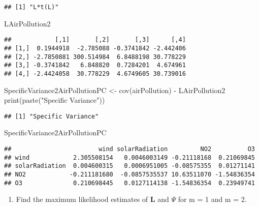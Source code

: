 \documentclass[
]{article}
\newenvironment{Shaded}{\begin{snugshade}}{\end{snugshade}}
\newcommand{\FunctionTok}[1]{\textcolor[rgb]{0.00,0.00,0.00}{#1}}
\newcommand{\NormalTok}[1]{#1}
\newcommand{\OtherTok}[1]{\textcolor[rgb]{0.56,0.35,0.01}{#1}}
\newcommand{\SpecialCharTok}[1]{\textcolor[rgb]{0.00,0.00,0.00}{#1}}
\newcommand{\StringTok}[1]{\textcolor[rgb]{0.31,0.60,0.02}{#1}}
\providecommand{\tightlist}{%
  \setlength{\itemsep}{0pt}\setlength{\parskip}{0pt}}
\begin{document}
\begin{verbatim}
## [1] "L*t(L)"
\end{verbatim}

\begin{Shaded}
\begin{Highlighting}[]
\NormalTok{LAirPollution2}
\end{Highlighting}
\end{Shaded}

\begin{verbatim}
##            [,1]       [,2]       [,3]      [,4]
## [1,]  0.1944918  -2.785088 -0.3741842 -2.442406
## [2,] -2.7850881 300.514984  6.8488198 30.778229
## [3,] -0.3741842   6.848820  0.7284201  4.674961
## [4,] -2.4424058  30.778229  4.6749605 30.739016
\end{verbatim}

\begin{Shaded}
\begin{Highlighting}[]
\NormalTok{SpecificVariance2AirPollutionPC }\OtherTok{\textless{}{-}} \FunctionTok{cov}\NormalTok{(airPollution) }\SpecialCharTok{{-}}\NormalTok{ LAirPollution2}
\FunctionTok{print}\NormalTok{(}\FunctionTok{paste}\NormalTok{(}\StringTok{"Specific Variance"}\NormalTok{))}
\end{Highlighting}
\end{Shaded}

\begin{verbatim}
## [1] "Specific Variance"
\end{verbatim}

\begin{Shaded}
\begin{Highlighting}[]
\NormalTok{SpecificVariance2AirPollutionPC}
\end{Highlighting}
\end{Shaded}

\begin{verbatim}
##                        wind solarRadiation         NO2          O3
## wind            2.305508154   0.0046003149 -0.21118168  0.21069845
## solarRadiation  0.004600315   0.0006951005 -0.08575355  0.01271141
## NO2            -0.211181680  -0.0857535537 10.63511070 -1.54836354
## O3              0.210698445   0.0127114138 -1.54836354  0.23949741
\end{verbatim}

\begin{enumerate}
\def\labelenumi{(\alph{enumi})}
\setcounter{enumi}{1}
\tightlist
\item
  Find the maximum likelihood estimates of \textbf{L} and \(\Psi\) for m
  = 1 and m = 2.
\end{enumerate}
\end{document}
